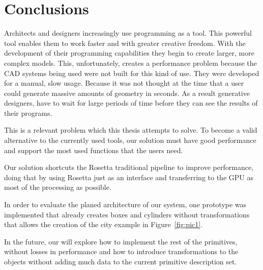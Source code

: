 
% 
% 

\section{Conclusions}
\label{sec:conclusions}

Architects and designers increasingly use programming as a tool. This powerful tool enables them to work faster and with greater creative freedom. With the development of their programming capabilities they begin to create larger, more complex models. This, unfortunately, creates a performance problem because the CAD systems being used were not built for this kind of use. They were developed for a manual, slow usage. Because it was not thought at the time that a user could generate massive amounts of geometry in seconds. As a result generative designers, have to wait for large periods of time before they can see the results of their programs.

This is a relevant problem which this thesis attempts to solve.
To become a valid alternative to the currently used tools, our solution must have good performance and support the most used functions that the users need.

Our solution shortcuts the Rosetta traditional pipeline to improve performance, doing that by using Rosetta just as an interface and transferring to the GPU as most of the processing as possible.

In order to evaluate the planed architecture of our system, one prototype was implemented that already creates boxes and cylinders without transformations that allows the creation of the city example in Figure~\ref{fig:pic1}.

In the future, our will explore how to implement the rest of the primitives, without losses in performance and how to introduce transformations to the objects without adding much data to the current primitive description set.